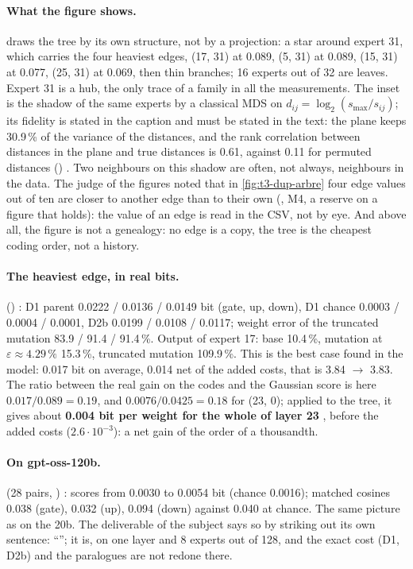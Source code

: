 \paragraph{What the figure shows.}  draws the tree by its own structure, not by a projection: a star around expert 31, which carries the four heaviest edges, (17, 31) at 0.089, (5, 31) at 0.089, (15, 31) at 0.077, (25, 31) at 0.069, then thin branches; 16 experts out of 32 are leaves. Expert 31 is a hub, the only trace of a family in all the measurements. The inset is the shadow of the same experts by a classical MDS on $d_{ij} = \log_2(s_{\max}/s_{ij})$; its fidelity is stated in the caption and must be stated in the text: the plane keeps 30.9\,\% of the variance of the distances, and the rank correlation between distances in the plane and true distances is 0.61, against 0.11 for permuted distances () \mes. Two neighbours on this shadow are often, not always, neighbours in the data. The judge of the figures noted that in \cref{fig:t3-dup-arbre} four edge values out of ten are closer to another edge than to their own (, M4, a reserve on a figure that holds): the value of an edge is read in the CSV, not by eye. And above all, the figure is not a genealogy: no edge is a copy, the tree is the cheapest coding order, not a history.

\paragraph{The heaviest edge, in real bits.}  () \mes: D1 parent 0.0222 / 0.0136 / 0.0149 bit (gate, up, down), D1 chance 0.0003 / 0.0004 / 0.0001, D2b 0.0199 / 0.0108 / 0.0117; weight error of the truncated mutation 83.9 / 91.4 / 91.4\,\%. Output of expert 17: base 10.4\,\%, mutation at $\varepsilon \approx 4.29\,\%$ 15.3\,\%, truncated mutation 109.9\,\%. This is the best case found in the model: 0.017 bit on average, 0.014 net of the added costs, that is 3.84 $\to$ 3.83. The ratio between the real gain on the codes and the Gaussian score is here $0.017/0.089 = 0.19$, and $0.0076/0.0425 = 0.18$ for (23, 0); applied to the tree, it gives about \textbf{0.004 bit per weight for the whole of layer 23} \calc, before the added costs ($2.6\cdot10^{-3}$): a net gain of the order of a thousandth.

\paragraph{On gpt-oss-120b.}  (28 pairs, ) \mes: scores from 0.0030 to 0.0054 bit (chance 0.0016); matched cosines 0.038 (gate), 0.032 (up), 0.094 (down) against 0.040 at chance. The same picture as on the 20b. The deliverable of the subject says so by striking out its own sentence: ``''; it is, on one layer and 8 experts out of 128, and the exact cost (D1, D2b) and the paralogues are not redone there.

